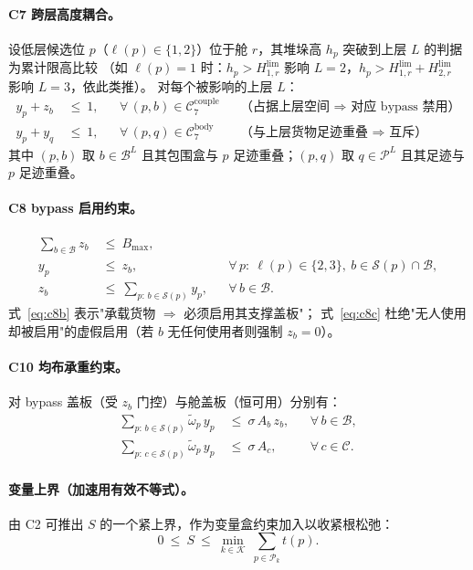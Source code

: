\documentclass[11pt]{article}
\begin{document}
\paragraph{C7 跨层高度耦合。}
设低层候选位 $p$（$\ell(p)\in\{1,2\}$）位于舱 $r$，其堆垛高 $h_p$ 突破到上层 $L$ 的判据为累计限高比较
（如 $\ell(p)=1$ 时：$h_p>H^{\lim}_{1,r}$ 影响 $L=2$，$h_p>H^{\lim}_{1,r}+H^{\lim}_{2,r}$ 影响 $L=3$，依此类推）。
对每个被影响的上层 $L$：
\begin{align}
y_p + z_b &\ \le\ 1, & &\forall\, (p,b)\in\mathcal{C}_7^{\text{couple}}
  && \text{（占据上层空间 $\Rightarrow$ 对应 bypass 禁用）} \label{eq:c7a}\\
y_p + y_q &\ \le\ 1, & &\forall\, (p,q)\in\mathcal{C}_7^{\text{body}}
  && \text{（与上层货物足迹重叠 $\Rightarrow$ 互斥）} \label{eq:c7b}
\end{align}
其中 $(p,b)$ 取 $b\in\mathcal{B}^{L}$ 且其包围盒与 $p$ 足迹重叠；$(p,q)$ 取 $q\in\mathcal{P}^{L}$ 且其足迹与 $p$ 足迹重叠。

\paragraph{C8 bypass 启用约束。}
\begin{align}
\sum_{b\in\mathcal{B}} z_b &\ \le\ B_{\max}, \label{eq:c8a}\\
y_p &\ \le\ z_b, & &\forall\, p:\ \ell(p)\in\{2,3\},\ b\in\mathcal{S}(p)\cap\mathcal{B}, \label{eq:c8b}\\
z_b &\ \le\ \sum_{p:\, b\in\mathcal{S}(p)} y_p, & &\forall\, b\in\mathcal{B}. \label{eq:c8c}
\end{align}
式~\eqref{eq:c8b} 表示"承载货物 $\Rightarrow$ 必须启用其支撑盖板"；
式~\eqref{eq:c8c} 杜绝"无人使用却被启用"的虚假启用（若 $b$ 无任何使用者则强制 $z_b=0$）。

\paragraph{C10 均布承重约束。}
对 bypass 盖板（受 $z_b$ 门控）与舱盖板（恒可用）分别有：
\begin{align}
\sum_{p:\, b\in\mathcal{S}(p)} \tilde\omega_p\, y_p &\ \le\ \sigma\, A_b\, z_b, & &\forall\, b\in\mathcal{B}, \label{eq:c10a}\\
\sum_{p:\, c\in\mathcal{S}(p)} \tilde\omega_p\, y_p &\ \le\ \sigma\, A_c, & &\forall\, c\in\mathcal{C}. \label{eq:c10b}
\end{align}

\paragraph{变量上界（加速用有效不等式）。}
由 C2 可推出 $S$ 的一个紧上界，作为变量盒约束加入以收紧根松弛：
\begin{equation}
0\ \le\ S\ \le\ \min_{k\in\mathcal{K}}\ \sum_{p\in\mathcal{P}_k} t(p).
\label{eq:bound}
\end{equation}
\end{document}

